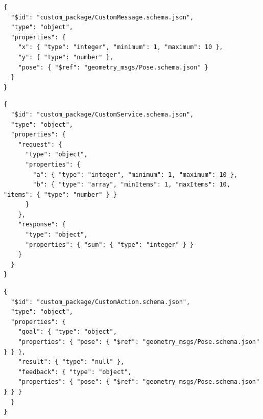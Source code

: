 \begin{lstlisting}[frame=tb,caption={ROS message definition using JSON schema},label=lst:json-ros-msg]
{
  "$id": "custom_package/CustomMessage.schema.json",
  "type": "object",
  "properties": {
    "x": { "type": "integer", "minimum": 1, "maximum": 10 },
    "y": { "type": "number" },
    "pose": { "$ref": "geometry_msgs/Pose.schema.json" }
  }
}
\end{lstlisting}

\begin{lstlisting}[frame=tb,caption={ROS service definition using JSON schema},label=lst:json-ros-srv]
{
  "$id": "custom_package/CustomService.schema.json",
  "type": "object",
  "properties": {
    "request": {
      "type": "object",
      "properties": {
        "a": { "type": "integer", "minimum": 1, "maximum": 10 },
        "b": { "type": "array", "minItems": 1, "maxItems": 10, "items": { "type": "number" } }
      }
    },
    "response": {
      "type": "object",
      "properties": { "sum": { "type": "integer" } }
    }
  }
}
\end{lstlisting}

\begin{lstlisting}[frame=tb,caption={ROS action definition using JSON schema},label=lst:json-ros-act]
{
  "$id": "custom_package/CustomAction.schema.json",
  "type": "object",
  "properties": {
    "goal": { "type": "object", 
    "properties": { "pose": { "$ref": "geometry_msgs/Pose.schema.json" } } },
    "result": { "type": "null" },
    "feedback": { "type": "object",
    "properties": { "pose": { "$ref": "geometry_msgs/Pose.schema.json" } } }
  }
}
\end{lstlisting}

